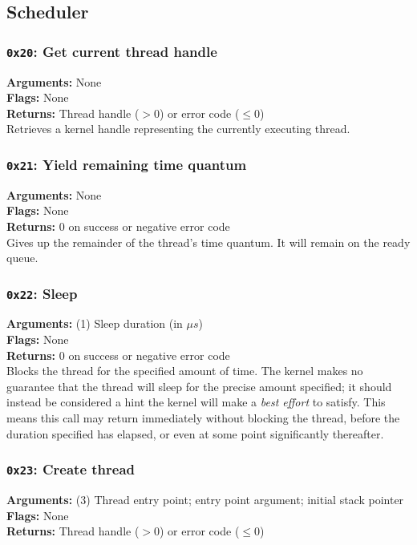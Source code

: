 \documentclass[11pt]{article}
\begin{document}
\newpage
\subsection{Scheduler}
\subsubsection{{\tt 0x20}: Get current thread handle}
\textbf{Arguments:} None \\
\textbf{Flags:} None \\
\textbf{Returns:} Thread handle ($>0$) or error code ($\leq0$) \\

Retrieves a kernel handle representing the currently executing thread.

\subsubsection{{\tt 0x21}: Yield remaining time quantum}
\textbf{Arguments:} None \\
\textbf{Flags:} None \\
\textbf{Returns:} 0 on success or negative error code \\

Gives up the remainder of the thread's time quantum. It will remain on the ready queue.

\subsubsection{{\tt 0x22}: Sleep}
\textbf{Arguments:} (1) Sleep duration (in $\mu s$) \\
\textbf{Flags:} None \\
\textbf{Returns:} 0 on success or negative error code \\

Blocks the thread for the specified amount of time. The kernel makes no guarantee that the thread will sleep for the precise amount specified; it should instead be considered a hint the kernel will make a \textit{best effort} to satisfy. This means this call may return immediately without blocking the thread, before the duration specified has elapsed, or even at some point significantly thereafter.

\subsubsection{{\tt 0x23}: Create thread}
\textbf{Arguments:} (3) Thread entry point; entry point argument; initial stack pointer \\
\textbf{Flags:} None \\
\textbf{Returns:} Thread handle ($>0$) or error code ($\leq0$) \\
\end{document}
